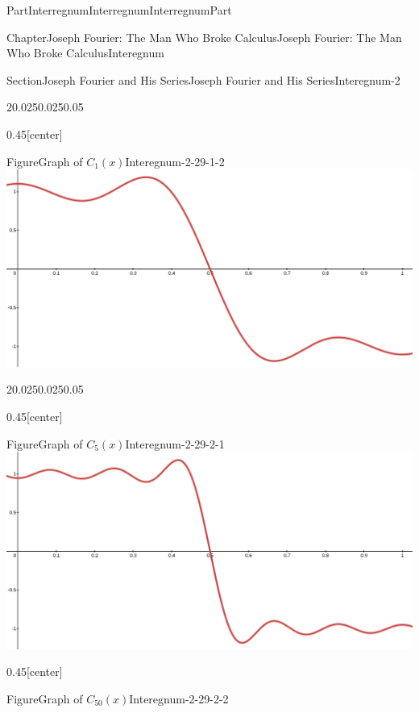 \documentclass[oneside,10pt,]{book}
\numberwithin{equation}{part}
\begin{document}
\begin{partptx}{Part}{Interregnum}{}{Interregnum}{}{}{InterregnumPart}
\begin{chapterptx}{Chapter}{Joseph Fourier: The Man Who Broke Calculus}{}{Joseph Fourier: The Man Who Broke Calculus}{}{}{Interegnum}
\begin{sectionptx}{Section}{Joseph Fourier and His Series}{}{Joseph Fourier and His Series}{}{}{Interegnum-2}
\begin{sidebyside}{2}{0.025}{0.025}{0.05}
\begin{sbspanel}{0.45}[center]
\begin{panelfigureptx}{Figure}{Graph of \(C_1(x)\)}{Interegnum-2-29-1-2}{}
\noindent\includegraphics[width=\linewidth]{external/images/FourierEx7-1.png}
\tcblower
\end{panelfigureptx}%
\end{sbspanel}%
\end{sidebyside}%
\begin{sidebyside}{2}{0.025}{0.025}{0.05}%
\begin{sbspanel}{0.45}[center]%
\begin{panelfigureptx}{Figure}{Graph of \(C_5(x)\)}{Interegnum-2-29-2-1}{}%
\noindent\includegraphics[width=\linewidth]{external/images/FourierEx8-1.png}
\tcblower
\end{panelfigureptx}%
\end{sbspanel}%
\begin{sbspanel}{0.45}[center]%
\begin{panelfigureptx}{Figure}{Graph of \(C_{50}(x)\)}{Interegnum-2-29-2-2}{}%

\end{panelfigureptx}
\end{sbspanel}
\end{sidebyside}
\end{sectionptx}
\end{chapterptx}
\end{partptx}
\end{document}
